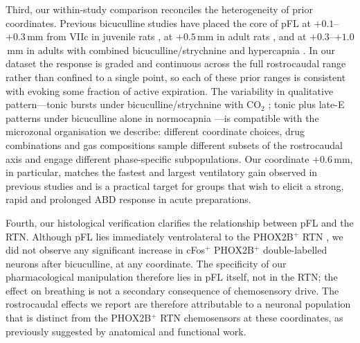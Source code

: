 \documentclass[11pt]{article}
\begin{document}
Third, our within-study comparison reconciles the heterogeneity of prior
coordinates. Previous bicuculline studies have placed the core of pFL at
$+0.1$--$+0.3$\,mm from VIIc in juvenile rats
\citep{deBritto2017GABAergic}, at $+0.5$\,mm in adult rats
\citep{Huckstepp2015Role,Pagliardini2011Active}, and at $+0.3$--$+1.0$\,mm
in adults with combined bicuculline/strychnine and hypercapnia
\citep{Silva2019Importance}. In our dataset the response is graded and
continuous across the full rostrocaudal range rather than confined to a
single point, so each of these prior ranges is consistent with evoking
some fraction of active expiration. The variability in qualitative
pattern---tonic bursts under bicuculline/strychnine with CO$_2$
\citep{Silva2019Importance}; tonic plus late-E patterns under bicuculline
alone in normocapnia
\citep{Pagliardini2011Active,deBritto2017GABAergic}---is compatible with
the microzonal organisation we describe: different coordinate choices,
drug combinations and gas compositions sample different subsets of the
rostrocaudal axis and engage different phase-specific subpopulations.
Our coordinate $+0.6$\,mm, in particular, matches the fastest and largest
ventilatory gain observed in previous studies and is a practical target
for groups that wish to elicit a strong, rapid and prolonged ABD
response in acute preparations.

Fourth, our histological verification clarifies the relationship between
pFL and the RTN. Although pFL lies immediately ventrolateral to the
PHOX2B$^+$ RTN \citep{Guyenet2010Central,GuyenetAbbott2013RTN,Takakura2013Phox2b},
we did not observe any significant increase in cFos$^+$ PHOX2B$^+$
double-labelled neurons after bicuculline, at any coordinate. The
specificity of our pharmacological manipulation therefore lies in pFL
itself, not in the RTN; the effect on breathing is not a secondary
consequence of chemosensory drive. The rostrocaudal effects we report
are therefore attributable to a neuronal population that is distinct
from the PHOX2B$^+$ RTN chemosensors at these coordinates, as previously
suggested by anatomical \citep{Marina2010Essential} and functional
\citep{Huckstepp2015Role,Pisanski2020Parafacial,Jenkin2017Roles} work.
\end{document}
